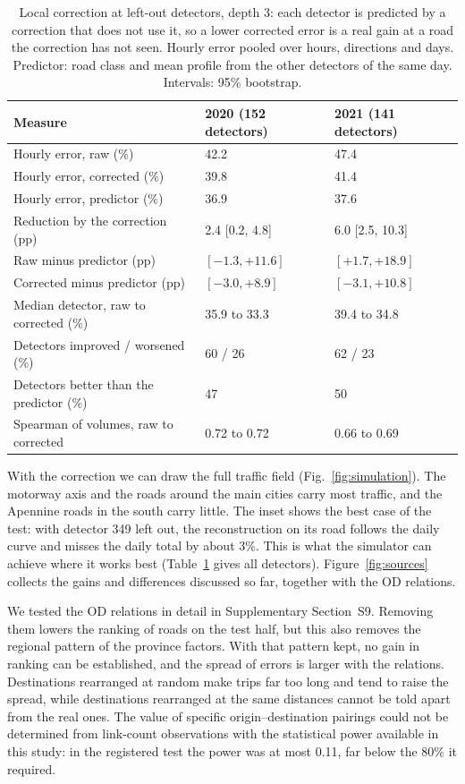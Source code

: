 \documentclass[preprint,11pt,a4paper]{elsarticle}
\begin{document}
\begin{table}[htbp]
\centering
\caption{Local correction at left-out detectors, depth 3: each detector is predicted by a correction that does not use it, so a lower corrected error is a real gain at a road the correction has not seen. Hourly error pooled over hours, directions and days. Predictor: road class and mean profile from the other detectors of the same day. Intervals: 95\% bootstrap.}
\label{tab:correction}
\begin{tabular}{@{}lll@{}}
\toprule
Measure & 2020 (152 detectors) & 2021 (141 detectors) \\
\midrule
Hourly error, raw (\%) & 42.2 & 47.4 \\
Hourly error, corrected (\%) & 39.8 & 41.4 \\
Hourly error, predictor (\%) & 36.9 & 37.6 \\
Reduction by the correction (pp) & 2.4 [0.2, 4.8] & 6.0 [2.5, 10.3] \\
Raw minus predictor (pp) & $[-1.3, +11.6]$ & $[+1.7, +18.9]$ \\
Corrected minus predictor (pp) & $[-3.0, +8.9]$ & $[-3.1, +10.8]$ \\
Median detector, raw to corrected (\%) & 35.9 to 33.3 & 39.4 to 34.8 \\
Detectors improved / worsened (\%) & 60 / 26 & 62 / 23 \\
Detectors better than the predictor (\%) & 47 & 50 \\
Spearman of volumes, raw to corrected & 0.72 to 0.72 & 0.66 to 0.69 \\
\bottomrule
\end{tabular}
\end{table}

With the correction we can draw the full traffic field (Fig.~\ref{fig:simulation}). The motorway axis and the roads around the main cities carry most traffic, and the Apennine roads in the south carry little. The inset shows the best case of the test: with detector 349 left out, the reconstruction on its road follows the daily curve and misses the daily total by about 3\%. This is what the simulator can achieve where it works best (Table~\ref{tab:correction} gives all detectors). Figure~\ref{fig:sources} collects the gains and differences discussed so far, together with the OD relations.

We tested the OD relations in detail in Supplementary Section~S9. Removing them lowers the ranking of roads on the test half, but this also removes the regional pattern of the province factors. With that pattern kept, no gain in ranking can be established, and the spread of errors is larger with the relations. Destinations rearranged at random make trips far too long and tend to raise the spread, while destinations rearranged at the same distances cannot be told apart from the real ones. The value of specific origin--destination pairings could not be determined from link-count observations with the statistical power available in this study: in the registered test the power was at most 0.11, far below the 80\% it required.
\end{document}
